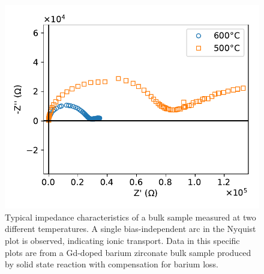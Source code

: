 \begin{figure}
\centering
\includegraphics{Figures/171223-eis-bzg-pellet-dry-ar-two-temp-comparison.pdf}
 \caption{Typical impedance characteristics of a bulk sample measured at two different temperatures. A single bias-independent arc in the Nyquist plot is observed, indicating ionic transport. Data in this specific plots are from a Gd-doped barium zirconate bulk sample produced by solid state reaction with compensation for barium loss.}
 \label{fig:general:eis}
\end{figure}

